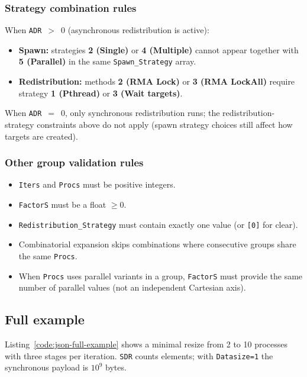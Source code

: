 \subsubsection{Strategy combination rules}
\label{subsubsection:strategy-rules}

When \texttt{ADR}~$>$~0 (asynchronous redistribution is active):

\begin{itemize}
  \item \textbf{Spawn:} strategies \textbf{2 (Single)} or \textbf{4 (Multiple)} cannot appear together with \textbf{5 (Parallel)} in the same \texttt{Spawn\_Strategy} array.
  \item \textbf{Redistribution:} methods \textbf{2 (RMA Lock)} or \textbf{3 (RMA LockAll)} require strategy \textbf{1 (Pthread)} or \textbf{3 (Wait targets)}.
\end{itemize}

When \texttt{ADR}~$=$~0, only synchronous redistribution runs; the redistribution-strategy constraints above do not apply (spawn strategy choices still affect how targets are created).

\subsubsection{Other group validation rules}

\begin{itemize}
  \item \texttt{Iters} and \texttt{Procs} must be positive integers.
  \item \texttt{FactorS} must be a float $\geq 0$.
  \item \texttt{Redistribution\_Strategy} must contain exactly one value (or \texttt{[0]} for clear).
  \item Combinatorial expansion skips combinations where consecutive groups share the same \texttt{Procs}.
  \item When \texttt{Procs} uses parallel variants in a group, \texttt{FactorS} must provide the same number of parallel values (not an independent Cartesian axis).
\end{itemize}

\subsection{Full example}

Listing~\ref{code:json-full-example} shows a minimal resize from 2 to 10 processes with three stages per iteration. \texttt{SDR} counts elements; with \texttt{Datasize=1} the synchronous payload is $10^9$ bytes.

